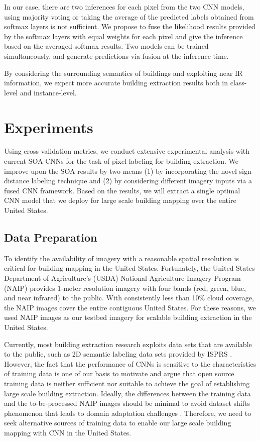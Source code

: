 \documentclass[journal]{IEEEtran}
\begin{document}
In our case, there are two inferences for each pixel from the two CNN models, using majority voting or taking the average of the predicted labels obtained from softmax layers is not sufficient. We propose to fuse the likelihood results provided by the softmax layers with equal weights for each pixel and give the inference based on the averaged softmax results. Two models can be trained simultaneously, and generate predictions via fusion at the inference time. 

By considering the surrounding semantics of buildings and exploiting near IR information, we expect more accurate building extraction results both in class-level and instance-level. 
\section{Experiments}

Using cross validation metrics, we conduct extensive experimental analysis with current SOA CNNs for the task of pixel-labeling for building extraction. We improve upon the SOA results by two means (1) by incorporating the novel sign-distance labeling technique and (2) by considering different imagery inputs via a fused CNN framework. Based on the results, we will extract a single optimal CNN model that we deploy for large scale building mapping over the entire United States.


\subsection{Data Preparation}
To identify the availability of imagery with a reasonable spatial resolution is critical for building mapping in the United States. Fortunately, the United States Department of Agriculture's (USDA) National Agriculture Imagery Program (NAIP) provides 1-meter resolution imagery with four bands (red, green, blue, and near infrared) to the public. With consistently less than 10\% cloud coverage, the NAIP images cover the entire contiguous United States. For these reasons, we used NAIP images as our testbed imagery for scalable building extraction in the United States.

Currently, most building extraction research exploits data sets that are available to the public, such as 2D semantic labeling data sets provided by ISPRS \cite{VolpiTuia2017}. However, the fact that the performance of CNNs is sensitive to the characteristics of training data is one of our basis to motivate and argue that open source training data is neither sufficient nor suitable to achieve the goal of establishing large scale building extraction. Ideally, the differences between the training data and the to-be-processed NAIP images should be minimal to avoid dataset shifts phenomenon that leads to domain adaptation challenges \cite{Quionero-CandelaSugiyamaSchwaighoferEtAl2009}. Therefore, we need to seek alternative sources of training data to enable our large scale building mapping with CNN in the United States.
\end{document}
